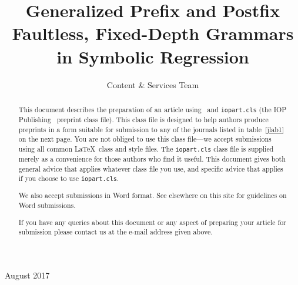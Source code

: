 \documentclass[12pt]{iopart}
\begin{document}
\title[Author guidelines for IOP Publishing journals in  \LaTeXe]{Generalized Prefix and Postfix Faultless, Fixed-Depth Grammars in Symbolic Regression}

\author{Content \& Services Team}

\address{IOP Publishing, Temple Circus, Temple Way, Bristol BS1 6HG, UK}
\vspace{10pt}
\begin{indented}
\item[]August 2017
\end{indented}

\begin{abstract}
This document describes the  preparation of an article using \LaTeXe\ and 
\verb"iopart.cls" (the IOP Publishing \LaTeXe\ preprint class file).
This class file is designed to help 
authors produce preprints in a form suitable for submission to any of the
journals listed in table~\ref{jlab1} on the next page.  You are not obliged to use this class file---we accept
submissions using all common \LaTeX\ class and style files.  The \verb"iopart.cls"
class file is supplied merely as a convenience for those authors who find it useful.
This document gives both general advice that applies whatever class file you use, and specific advice
that applies if you choose to use \verb"iopart.cls".

We also accept submissions in Word format.  See elsewhere on this site for guidelines on Word submissions.

If you have any queries about this document or any aspect of preparing your article for submission please contact us at the e-mail address given above.
\end{abstract}

%
%
%
% 
%
\end{document}
